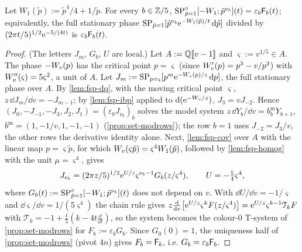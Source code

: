 
\begin{lem}
\label{lem:con-S2}
Let $W_1(\tilde p):=\tilde p^4/4+1/\tilde p$. For every $b\in\mathbb{Z}/5$, $\mathrm{SP}^{\circ}_{\tilde p=1}[-W_1;\tilde p^{\nu_b}](t)=\varepsilon_b\mathsf{F}_b(t)$; equivalently, the full stationary phase $\mathrm{SP}_{\tilde p=1}[\tilde p^{\nu_b}\mathrm{e}^{-W_1(\tilde p)/t}\,\mathrm{d}\tilde p]$ divided by $(2\pi t/5)^{1/2}\mathrm{e}^{-5/(4t)}$ is $\varepsilon_b\mathsf{F}_b(t)$.
\end{lem}

\begin{proof}
(The letters $J_m$, $G_b$, $U$ are local.) Let $A:=\mathbb{Q}[\![ v-1 ]\!]$ and $\varsigma:=v^{1/5}\in A$. The phase $-W_{v}(p)$ has the critical point $p=\varsigma$ (since $W_{v}'(p)=p^3-v/p^2$) with $W_{v}''(\varsigma)=5\varsigma^2$, a unit of $A$. Let $J_m:=\mathrm{SP}_{p=\varsigma}[p^m\mathrm{e}^{-W_{v}(p)/z}\,\mathrm{d} p]$, the full stationary phase over $A$. By \cref{lem:fsp-dq}, with the moving critical point $\varsigma$, $z\,\dd J_m/\dd v=-J_{m-1}$; by \cref{lem:fsp-ibp} applied to $\mathrm{d}(\mathrm{e}^{-W_{v}/z})$, $J_3=vJ_{-2}$. Hence $(J_0,-J_{-1},-J_3,J_2,J_1)=(\varepsilon_bJ_{\nu_b})_b$ solves the model system $z\,\dd Y_b/\dd v=b^{\mathrm m}_bY_{b+1}$, $b^{\mathrm m}=(1,-1/v,1,-1,-1)$ (\cref{prop:set-modrows}); the row $b=1$ uses $J_{-2}=J_3/v$, the other rows the derivative identity alone. Next, \cref{lem:fsp-cov} over $A$ with the linear map $p=\varsigma\tilde p$, for which $W_{v}(\varsigma\tilde p)=\varsigma^4W_1(\tilde p)$, followed by \cref{lem:fsp-homog} with the unit $\mu=\varsigma^4$, gives
\[
J_{\nu_b}=(2\pi z/5)^{1/2}\mathrm{e}^{U/z}\varsigma^{\nu_b-1}G_b(z/\varsigma^4),\qquad U=-\tfrac54\varsigma^4,
\]
where $G_b(t):=\mathrm{SP}^{\circ}_{\tilde p=1}[-W_1;\tilde p^{\nu_b}](t)$ does not depend on $v$. With $\dd U/\dd v=-1/\varsigma$ and $\dd\varsigma/\dd v=1/(5\varsigma^4)$ the chain rule gives $z\frac{\mathrm{d}}{\mathrm{d} v}\bigl[\mathrm{e}^{U/z}\varsigma^{k}F(z/\varsigma^4)\bigr]=\mathrm{e}^{U/z}\varsigma^{k-1}\mathcal T_kF$ with $\mathcal T_k=-1+\frac t5(k-4t\frac{\dd}{\dd t})$, so the system becomes the colour-$0$ T-system of \cref{prop:set-modrows} for $F_b:=\varepsilon_bG_b$. Since $G_0(0)=1$, the uniqueness half of \cref{prop:set-modrows} (pivot $4n$) gives $F_b=\mathsf{F}_b$, i.e. $G_b=\varepsilon_b\mathsf{F}_b$.
\end{proof}

